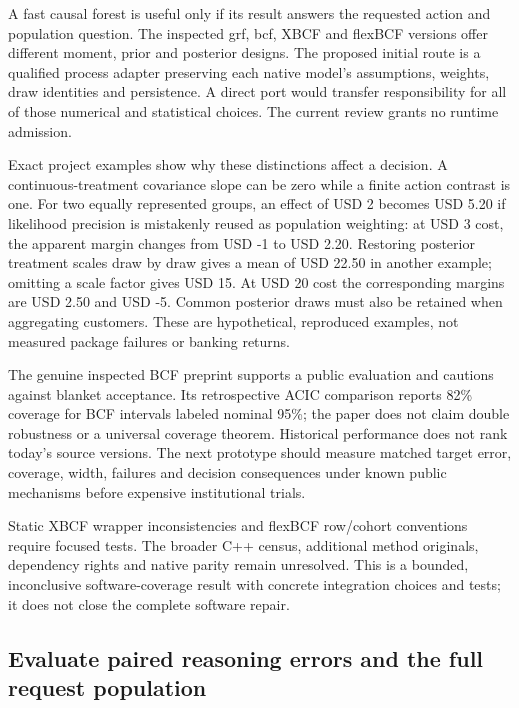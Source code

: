 A fast causal forest is useful only if its result answers the requested
action and population question. The inspected grf, bcf, XBCF and flexBCF
versions offer different moment, prior and posterior designs. The
proposed initial route is a qualified process adapter preserving each
native model's assumptions, weights, draw identities and persistence. A
direct port would transfer responsibility for all of those numerical and
statistical choices. The current review grants no runtime admission.
\citep{exec21_cxx_grf,exec21_cxx_bcf,exec21_cxx_xbcf,exec21_cxx_flexbcf}

Exact project examples show why these distinctions affect a decision. A
continuous-treatment covariance slope can be zero while a finite action
contrast is one. For two equally represented groups, an effect of USD 2
becomes USD 5.20 if likelihood precision is mistakenly reused as
population weighting: at USD 3 cost, the apparent margin changes from
USD -1 to USD 2.20. Restoring posterior treatment scales draw by draw
gives a mean of USD 22.50 in another example; omitting a scale factor
gives USD 15. At USD 20 cost the corresponding margins are USD 2.50 and
USD -5. Common posterior draws must also be retained when aggregating
customers. These are hypothetical, reproduced examples, not measured
package failures or banking returns. \citep{exec21_cxx_reference}

The genuine inspected BCF preprint supports a public evaluation and
cautions against blanket acceptance. Its retrospective ACIC comparison
reports 82\% coverage for BCF intervals labeled nominal 95\%; the paper
does not claim double robustness or a universal coverage theorem.
Historical performance does not rank today's source versions. The next
prototype should measure matched target error, coverage, width, failures
and decision consequences under known public mechanisms before expensive
institutional trials. \citep{exec21_cxx_hahn}

Static XBCF wrapper inconsistencies and flexBCF row/cohort conventions
require focused tests. The broader C++ census, additional method
originals, dependency rights and native parity remain unresolved. This
is a bounded, inconclusive software-coverage result with concrete
integration choices and tests; it does not close the complete software
repair. \citep{exec21_cxx_xbcf,exec21_cxx_flexbcf}

\hypertarget{evaluate-paired-reasoning-errors-and-the-full-request-population}{%
\subsection{Evaluate paired reasoning errors and the full request
population}\label{evaluate-paired-reasoning-errors-and-the-full-request-population}}

